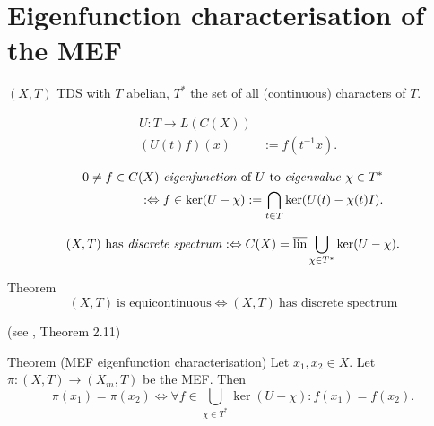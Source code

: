 \section{Eigenfunction characterisation of the MEF}
\begin{frame}
  $(X,T)$ TDS with $T$ abelian, $T^*$ the set of all (continuous) characters of $T$.
\begin{definition}
  \begin{equation*}
    \begin{split}
      &U : T \longrightarrow L(C(X)) \\
      &(U(t) f)(x) &:= f(t^{-1}x).
    \end{split}
  \end{equation*}
   \end{definition}
   \pause
   \begin{definition}
   \begin{equation*}
    \begin{split}
      0 \neq f \in C(X) \ \text{\emph{eigenfunction} of} \ U \ \text{to \emph{eigenvalue}} \ \chi \in T^*   \\
: \Leftrightarrow f \in \ker (U-\chi):= \bigcap_{t \in T} \ker (U(t)- \chi (t)I).
    \end{split}
      \end{equation*}
   \end{definition}
\end{frame}
\begin{frame}[fragile]
 \begin{definition}
  \begin{equation*}
    (X,T) \ \text{has \emph{discrete spectrum}}:\Leftrightarrow C(X) = \overline{\operatorname{lin}} \bigcup_{\chi \in T^*} \ker (U- \chi).
  \end{equation*}
\end{definition}
\pause 
  \begin{alertblock}{Theorem}
  \begin{equation*}
    (X,T) \ \text{is equicontinuous} \Leftrightarrow (X,T) \ \text{has discrete spectrum}
  \end{equation*}

    \hfill(see \cite{HK2023}, Theorem 2.11)
\end{alertblock}
\pause
  \begin{alertblock}{Theorem (MEF eigenfunction characterisation)}
  \label{thm:MEF_EFchar}
  Let $x_1,x_2 \in X$. Let $\pi : (X,T) \to (X_m,T)$ be the MEF.
  Then
  \begin{equation*}
  \pi (x_1) = \pi (x_2) \Leftrightarrow 
    \forall f \in \bigcup_{\chi \in T^*} \ker (U- \chi) : f(x_1) = f(x_2).
  \end{equation*}
\end{alertblock}
\end{frame}

